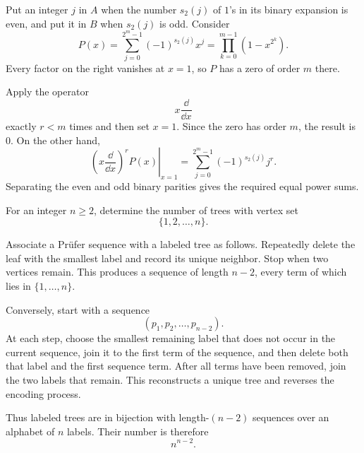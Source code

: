     \begin{solution}
        Put an integer $j$ in $A$ when the number $s_2(j)$ of $1$'s in its
        binary expansion is even, and put it in $B$ when $s_2(j)$ is odd.
        Consider
        \[
            P(x)
            =
            \sum_{j=0}^{2^m-1}(-1)^{s_2(j)}x^j
            =
            \prod_{k=0}^{m-1}(1-x^{2^k}).
        \]
        Every factor on the right vanishes at $x=1$, so $P$ has a zero of order
        $m$ there.

        Apply the operator
        \[
            x\frac{\dd}{\dd x}
        \]
        exactly $r<m$ times and then set $x=1$. Since the zero has order $m$,
        the result is $0$. On the other hand,
        \[
            \left.
            \left(x\frac{\dd}{\dd x}\right)^r P(x)
            \right|_{x=1}
            =
            \sum_{j=0}^{2^m-1}(-1)^{s_2(j)}j^r.
        \]
        Separating the even and odd binary parities gives the required equal
        power sums.
    \end{solution}

    \begin{expectedproblem}
        For an integer $n\geq2$, determine the number of trees with vertex set
        \[
            \{1,2,\ldots,n\}.
        \]
    \end{expectedproblem}

    \begin{solution}
        Associate a Pr\"ufer sequence with a labeled tree as follows. Repeatedly
        delete the leaf with the smallest label and record its unique neighbor.
        Stop when two vertices remain. This produces a sequence of length
        $n-2$, every term of which lies in $\{1,\ldots,n\}$.

        Conversely, start with a sequence
        \[
            (p_1,p_2,\ldots,p_{n-2}).
        \]
        At each step, choose the smallest remaining label that does not occur
        in the current sequence, join it to the first term of the sequence, and
        then delete both that label and the first sequence term. After all terms have
        been removed, join the two labels that remain. This reconstructs a
        unique tree and reverses the encoding process.

        Thus labeled trees are in bijection with length-$(n-2)$ sequences over
        an alphabet of $n$ labels. Their number is therefore
        \[
            \boxed{n^{n-2}}.
        \]
    \end{solution}

